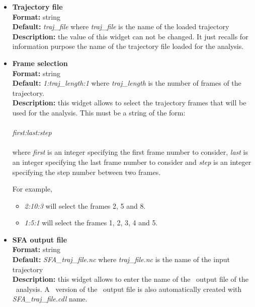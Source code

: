 \documentclass[a4paper,11pt]{report}
\begin{document}
\hypertarget{sfa_trajectory_file}{}
\begin{itemize}
\item \textbf{Trajectory file}\\
\textbf{Format:} string\\
\textbf{Default:} \textit{traj\_file} where \textit{traj\_file} is the name of the loaded trajectory\\
\textbf{Description:} the value of this widget can not be changed. It just recalls for information purpose the name
of the trajectory file loaded for the analysis.

\hypertarget{sfa_frame_selection}{}
\item \textbf{Frame selection}\\
\textbf{Format:} string\\
\textbf{Default:} \textit{1:traj\_length:1} where \textit{traj\_length} is the number of frames of the trajectory.\\
\textbf{Description:} this widget allows to select the trajectory frames that will be used for the analysis. This must
be a string of the form:
\\\\
\textit{first:last:step}
\\\\
where \textit{first} is an integer specifying the first frame number to consider, \textit{last} is an integer specifying the last 
frame number to consider and \textit{step} is an integer specifying the step number between two frames.

For example,
\begin{itemize}
\item \textit{2:10:3} will select the frames 2, 5 and 8.
\item \textit{1:5:1} will select the frames 1, 2, 3, 4 and 5.
\end{itemize}

\hypertarget{sfa_sfa_output_file}{}
\item \textbf{SFA output file}\\
\textbf{Format:} string\\
\textbf{Default:} \textit{SFA\_traj\_file.nc} where \textit{traj\_file.nc} is the name of the input trajectory\\
\textbf{Description:} this widget allows to enter the name of the \NetCDF\ output file of the \SFA\ analysis. A \CDL\ 
version of the \NetCDF\ output file is also automatically created with \textit{SFA\_traj\_file.cdl} name.
\end{itemize}
\end{document}
